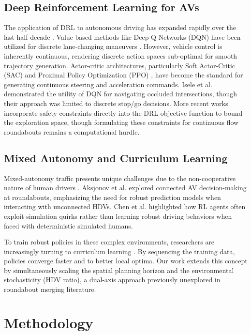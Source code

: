 \documentclass[conference]{IEEEtran}
\begin{document}
\subsection{Deep Reinforcement Learning for AVs}
The application of DRL to autonomous driving has expanded rapidly over the last half-decade \cite{kiran2021deep}. Value-based methods like Deep Q-Networks (DQN) have been utilized for discrete lane-changing maneuvers \cite{aradi2020survey}. However, vehicle control is inherently continuous, rendering discrete action spaces sub-optimal for smooth trajectory generation. Actor-critic architectures, particularly Soft Actor-Critic (SAC) \cite{haarnoja2018soft} and Proximal Policy Optimization (PPO) \cite{schulman2017proximal}, have become the standard for generating continuous steering and acceleration commands. Isele et al. \cite{isele2018navigating} demonstrated the utility of DQN for navigating occluded intersections, though their approach was limited to discrete stop/go decisions. More recent works \cite{li2022deep} incorporate safety constraints directly into the DRL objective function to bound the exploration space, though formulating these constraints for continuous flow roundabouts remains a computational hurdle.

\subsection{Mixed Autonomy and Curriculum Learning}
Mixed-autonomy traffic presents unique challenges due to the non-cooperative nature of human drivers \cite{wu2021flow}. Aksjonov et al. \cite{aksjonov2021novel} explored connected AV decision-making at roundabouts, emphasizing the need for robust prediction models when interacting with unconnected HDVs. Chen et al. \cite{chen2020autonomous} highlighted how RL agents often exploit simulation quirks rather than learning robust driving behaviors when faced with deterministic simulated humans. 

To train robust policies in these complex environments, researchers are increasingly turning to curriculum learning \cite{narvekar2020curriculum}. By sequencing the training data, policies converge faster and to better local optima. Our work extends this concept by simultaneously scaling the spatial planning horizon and the environmental stochasticity (HDV ratio), a dual-axis approach previously unexplored in roundabout merging literature.

\section{Methodology}
\end{document}

